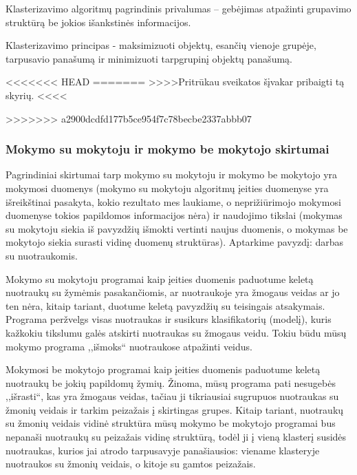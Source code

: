 Klasterizavimo algoritmų pagrindinis privalumas – gebėjimas atpažinti grupavimo
struktūrą be jokios išankstinės informacijos. 

Klasterizavimo principas - maksimizuoti objektų, esančių vienoje grupėje,
tarpusavio panašumą ir minimizuoti tarpgrupinį objektų panašumą.


<<<<<<< HEAD
=======
{\centering>>>>Pritrūkau sveikatos šįvakar pribaigti tą skyrių. <<<< }

>>>>>>> a2900dcdfd177b5ce954f7c78becbe2337abbb07



\subsubsection{Mokymo su mokytoju ir mokymo be mokytojo skirtumai}

Pagrindiniai skirtumai tarp mokymo su mokytoju ir mokymo be mokytojo yra
mokymosi duomenys (mokymo su mokytoju algoritmų įeities duomenyse yra
išreikštinai pasakyta, kokio rezultato mes laukiame, o neprižiūrimojo mokymosi
duomenyse tokios papildomos informacijos nėra) ir naudojimo tikslai (mokymas
su mokytoju siekia iš pavyzdžių išmokti vertinti naujus duomenis, o mokymas be
mokytojo siekia surasti vidinę duomenų struktūras). Aptarkime pavyzdį: darbas
su nuotraukomis.

Mokymo su mokytoju programai kaip įeities duomenis paduotume keletą 
nuotraukų su žymėmis pasakančiomis, ar nuotraukoje yra žmogaus veidas ar jo ten
nėra, kitaip tariant, duotume keletą pavyzdžių su teisingais atsakymais.
Programa peržvelgs visas nuotraukas ir susikurs klasifikatorių (modelį), kuris
kažkokiu tikslumu galės atskirti nuotraukas su žmogaus veidu. Tokiu būdu mūsų
mokymo programa ,,išmoks`` nuotraukose atpažinti veidus.

Mokymosi be mokytojo programai kaip įeities duomenis paduotume keletą
nuotraukų be jokių papildomų žymių. Žinoma, mūsų programa pati nesugebės
,,išrasti``, kas yra žmogaus veidas, tačiau ji tikriausiai sugrupuos nuotraukas
su žmonių veidais ir tarkim peizažais į skirtingas grupes. Kitaip tariant,
nuotraukų su žmonių veidais vidinė struktūra mūsų mokymo be mokytojo programai
bus nepanaši nuotraukų su peizažais vidinę struktūrą, todėl ji į vieną klasterį
susidės nuotraukas, kurios jai atrodo tarpusavyje panašiausios: viename
klasteryje nuotraukos su žmonių veidais, o kitoje su gamtos peizažais.

